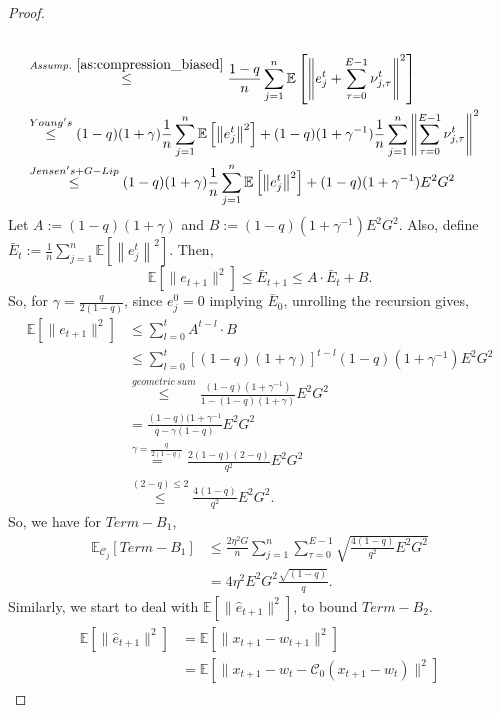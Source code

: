 \documentclass{article} %
\DeclareMathOperator{\E}{\E}
\def\C{{\mathcal C}}
\def\E{{\mathbb E}}
\begin{document}
\begin{proof}
\begin{align*}
   \\
   &\overset{\textit{Assump.}~\ref{as:compression_biased}}{\leq} \frac{1 - q}{n}\sum_{j=1}^n \E\left[\left\| e_j^t + \sum_{\tau=0}^{E-1}\nu_{j,\tau}^t \right\|^2\right]
   \\
   &\overset{Young's}{\leq} (1 - q) (1+\gamma) \frac{1}{n}\sum_{j=1}^n \E\left[\left\| e_j^t\right\|^2\right] + (1 - q) (1+\gamma^{-1})\frac{1}{n}\sum_{j=1}^n \left\|\sum_{\tau=0}^{E-1}\nu_{j,\tau}^t \right\|^2
   \\
   &\overset{Jensen's + G-Lip}{\leq} (1 - q) (1+\gamma) \frac{1}{n}\sum_{j=1}^n \E\left[\left\| e_j^t\right\|^2\right] + (1 - q) (1+\gamma^{-1})E^2 G^2
\end{align*}
Let $A:=(1 - q) (1+\gamma)$ and $B:=(1 - q) (1+\gamma^{-1})E^2 G^2$. Also, define $\bar{E}_t := \frac{1}{n}\sum_{j=1}^n \E\left[\left\| e_j^t\right\|^2\right]$. Then,
$$\E[\|e_{t+1}\|^2] \leq \bar{E}_{t+1} \leq A\cdot \bar{E}_t + B.$$ So, for $\gamma = \frac{q}{2(1-q)}$, since $e_j^0=0$ implying $\bar{E}_0$, unrolling the recursion gives,
\begin{align*}
    \E[\|e_{t+1}\|^2] &\leq \sum_{l=0}^t A^{t-l}\cdot B
    \\
    & \leq \sum_{l=0}^t \left[(1 - q) (1+\gamma)\right]^{t-l}(1 - q) (1+\gamma^{-1})E^2 G^2
    \\
    &\overset{geometric\ sum}{\leq} \frac{(1-q)(1+\gamma^{-1})}{1 - (1 - q) (1+\gamma)}E^2G^2
    \\
    & = \frac{(1-q)(1+\gamma^{-1}}{ q - \gamma(1-q)}E^2G^2
    \\
    &\overset{\gamma = \frac{q}{2(1-q)}}{=} \frac{2(1-q)(2-q)}{ q^2}E^2G^2
    \\
    &\overset{(2-q)\leq2}{\leq} \frac{4(1-q)}{ q^2}E^2G^2.
\end{align*}
So, we have for $Term-B_1$,
\begin{align*}
    \E_{\C_j}[Term-B_1] &\leq \frac{2 \eta^2 G}{n} \sum_{j=1}^n  \sum_{\tau=0}^{E-1} \sqrt{\frac{4(1-q)}{ q^2}E^2G^2
    }
    \\
    &=4\eta^2E^2G^2\frac{\sqrt{(1-q)}}{q}.
\end{align*}
Similarly, we start to deal with $\E[\|\hat{e}_{t+1}\|^2]$, to bound $Term-B_2$.
\begin{align}
\label{eq:global_error}
    \begin{aligned}
        \E[\|\hat{e}_{t+1}\|^2] &= \E\left[\|x_{t+1} - w_{t+1}\|^2\right]
        \\
        & = \E\left[\|x_{t+1} -w_t - \C_0(x_{t+1}-w_t)\|^2\right]

\end{aligned}
\end{align}
\end{proof}
\end{document}
